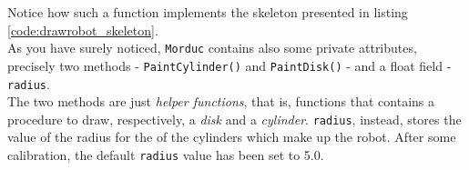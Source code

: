 Notice how such a function implements the skeleton 
presented in listing \ref{code:drawrobot_skeleton}.
\\
As you have surely noticed, \texttt{Morduc} contains also 
some private attributes, precisely two methods - 
\texttt{PaintCylinder()} and \texttt{PaintDisk()} - and 
a float field - \texttt{radius}.
\\
The two methods are just \textit{helper functions}, that is, 
functions that contains a procedure to draw, respectively,  
a \textit{disk} and a \textit{cylinder}.
\texttt{radius}, instead, stores the value of the radius 
for the of the cylinders which make up the robot.
After some calibration, the default \texttt{radius} value 
has been set to 5.0.
